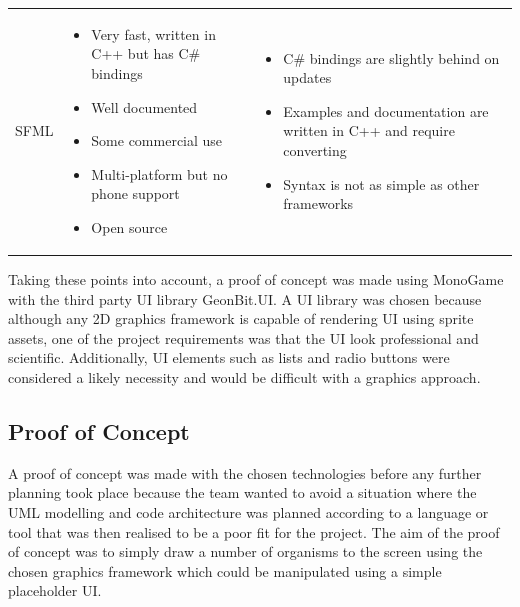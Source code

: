 \documentclass{ueacmpstyle}
\begin{document}
\begin{center}
\begin{tabular}{c|p{}|p{}}
		SFML & \begin{itemize}
			\item Very fast, written in C++ but has C\# bindings
			\item Well documented
			\item Some commercial use
			\item Multi-platform but no phone support
			\item Open source
		\end{itemize} & \begin{itemize}
			\item C\# bindings are slightly behind on updates
			\item Examples and documentation are written in C++ and require conv\label{classdiagram}erting
			\item Syntax is not as simple as other frameworks
		\end{itemize} \\
	\end{tabular}
\end{center}

\pagebreak
Taking these points into account, a proof of concept was made using MonoGame with the third party UI library GeonBit.UI. A UI library was chosen because although any 2D graphics framework is capable of rendering UI using sprite assets, one of the project requirements was that the UI look professional and scientific. Additionally, UI elements such as lists and radio buttons were considered a likely necessity and would be difficult with a graphics approach.

\subsection{Proof of Concept}
A proof of concept was made with the chosen technologies before any further planning took place because the team wanted to avoid a situation where the UML modelling and code architecture was planned according to a language or tool that was then realised to be a poor fit for the project. The aim of the proof of concept was to simply draw a number of organisms to the screen using the chosen graphics framework which could be manipulated using a simple placeholder UI.
\end{document}
